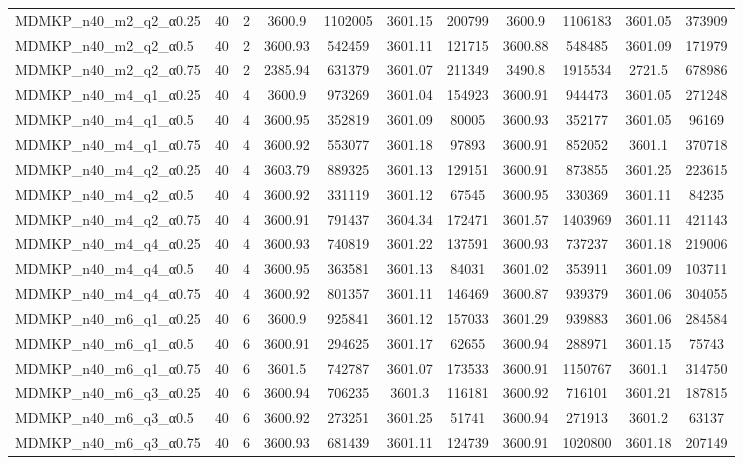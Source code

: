 \begin{table}[!ht]
\begin{tabular}{lcccccccccc}
MDMKP\_n40\_m2\_q2\_α0.25 & 40 & 2 & 3600.9 & 1102005 & 3601.15 & 200799 & 3600.9 & 1106183 & 3601.05 & 373909 \\
MDMKP\_n40\_m2\_q2\_α0.5 & 40 & 2 & 3600.93 & 542459 & 3601.11 & 121715 & 3600.88 & 548485 & 3601.09 & 171979 \\
MDMKP\_n40\_m2\_q2\_α0.75 & 40 & 2 & 2385.94 & 631379 & 3601.07 & 211349 & 3490.8 & 1915534 & 2721.5 & 678986 \\
MDMKP\_n40\_m4\_q1\_α0.25 & 40 & 4 & 3600.9 & 973269 & 3601.04 & 154923 & 3600.91 & 944473 & 3601.05 & 271248 \\
MDMKP\_n40\_m4\_q1\_α0.5 & 40 & 4 & 3600.95 & 352819 & 3601.09 & 80005 & 3600.93 & 352177 & 3601.05 & 96169 \\
MDMKP\_n40\_m4\_q1\_α0.75 & 40 & 4 & 3600.92 & 553077 & 3601.18 & 97893 & 3600.91 & 852052 & 3601.1 & 370718 \\
MDMKP\_n40\_m4\_q2\_α0.25 & 40 & 4 & 3603.79 & 889325 & 3601.13 & 129151 & 3600.91 & 873855 & 3601.25 & 223615 \\
MDMKP\_n40\_m4\_q2\_α0.5 & 40 & 4 & 3600.92 & 331119 & 3601.12 & 67545 & 3600.95 & 330369 & 3601.11 & 84235 \\
MDMKP\_n40\_m4\_q2\_α0.75 & 40 & 4 & 3600.91 & 791437 & 3604.34 & 172471 & 3601.57 & 1403969 & 3601.11 & 421143 \\
MDMKP\_n40\_m4\_q4\_α0.25 & 40 & 4 & 3600.93 & 740819 & 3601.22 & 137591 & 3600.93 & 737237 & 3601.18 & 219006 \\
MDMKP\_n40\_m4\_q4\_α0.5 & 40 & 4 & 3600.95 & 363581 & 3601.13 & 84031 & 3601.02 & 353911 & 3601.09 & 103711 \\
MDMKP\_n40\_m4\_q4\_α0.75 & 40 & 4 & 3600.92 & 801357 & 3601.11 & 146469 & 3600.87 & 939379 & 3601.06 & 304055 \\
MDMKP\_n40\_m6\_q1\_α0.25 & 40 & 6 & 3600.9 & 925841 & 3601.12 & 157033 & 3601.29 & 939883 & 3601.06 & 284584 \\
MDMKP\_n40\_m6\_q1\_α0.5 & 40 & 6 & 3600.91 & 294625 & 3601.17 & 62655 & 3600.94 & 288971 & 3601.15 & 75743 \\
MDMKP\_n40\_m6\_q1\_α0.75 & 40 & 6 & 3601.5 & 742787 & 3601.07 & 173533 & 3600.91 & 1150767 & 3601.1 & 314750 \\
MDMKP\_n40\_m6\_q3\_α0.25 & 40 & 6 & 3600.94 & 706235 & 3601.3 & 116181 & 3600.92 & 716101 & 3601.21 & 187815 \\
MDMKP\_n40\_m6\_q3\_α0.5 & 40 & 6 & 3600.92 & 273251 & 3601.25 & 51741 & 3600.94 & 271913 & 3601.2 & 63137 \\
MDMKP\_n40\_m6\_q3\_α0.75 & 40 & 6 & 3600.93 & 681439 & 3601.11 & 124739 & 3600.91 & 1020800 & 3601.18 & 207149 \\

\end{tabular}
\end{table}
